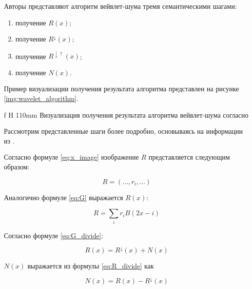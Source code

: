 Авторы \cite{pixar} представляют алгоритм вейвлет-шума тремя семантическими шагами:
\begin{enumerate}
	\item получение $R(x)$;%
	\item получение $R^\downarrow(x)$;%
	\item получение $R^{\downarrow\uparrow}(x)$;%
	\item получение $N(x)$.%
\end{enumerate}

Пример визуализации получения результата алгоритма представлен на рисунке \ref{img:wavelet_algorithm}.

 {f} {H} {110mm}%
{Визуализация получения результата алгоритма вейвлет-шума согласно \cite{pixar}}

Рассмотрим представленные шаги более подробно, основываясь на информации из \cite{pixar}.


Согласно формуле \ref{eq:x_image} изображение $R$ представляется следующим образом:

\begin{equation}\label{eq:R_image}
	R=(\dots,r_i,\dots)
\end{equation}

Аналогично формуле \ref{eq:G} выражается $R(x)$:

\begin{equation}\label{eq:R}
	R=\sum_{i}r_i B(2x-i)
\end{equation}


Согласно формуле \ref{eq:G_divide}:

\begin{equation}\label{eq:R_divide}
	R(x)=R^{\downarrow}(x)+N(x)
\end{equation}

$N(x)$ выражается из формулы \ref{eq:R_divide} как

\begin{equation}\label{eq:N_divide}
	N(x)=R(x)-R^{\downarrow}(x)
\end{equation}

